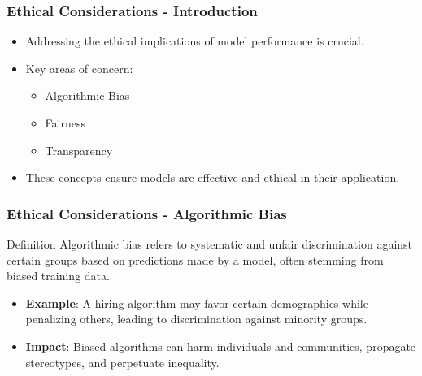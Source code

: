 \documentclass{beamer}
\begin{document}
\begin{frame}[fragile]
    \frametitle{Ethical Considerations - Introduction}
    \begin{itemize}
        \item Addressing the ethical implications of model performance is crucial.
        \item Key areas of concern:
            \begin{itemize}
                \item Algorithmic Bias
                \item Fairness
                \item Transparency
            \end{itemize}
        \item These concepts ensure models are effective and ethical in their application.
    \end{itemize}
\end{frame}

\begin{frame}[fragile]
    \frametitle{Ethical Considerations - Algorithmic Bias}
    \begin{block}{Definition}
        Algorithmic bias refers to systematic and unfair discrimination against certain groups based on predictions made by a model, often stemming from biased training data.
    \end{block}
    
    \begin{itemize}
        \item \textbf{Example}: A hiring algorithm may favor certain demographics while penalizing others, leading to discrimination against minority groups.
        \item \textbf{Impact}: Biased algorithms can harm individuals and communities, propagate stereotypes, and perpetuate inequality.
    \end{itemize}
\end{frame}
\end{document}
